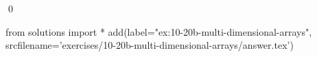 
\begin{ex} 
  \label{ex:10-20b-multi-dimensional-arrays}
  
  \qed
\end{ex} 
\begin{python0}
from solutions import *
add(label="ex:10-20b-multi-dimensional-arrays",
    srcfilename='exercises/10-20b-multi-dimensional-arrays/answer.tex') 
\end{python0}
